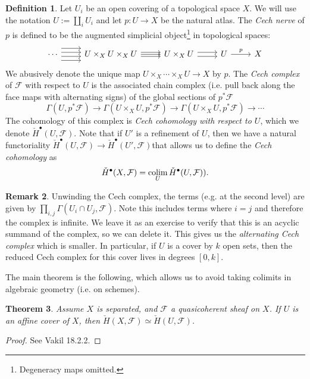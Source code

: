 \documentclass[10pt]{article}
\newtheorem{thm}{Theorem}[section]
\theoremstyle{definition}
\newtheorem{defn}[thm]{Definition}
\newtheorem{rmk}[thm]{Remark}
\newcommand{\colim}{\operatornamewithlimits{colim}}
\begin{document}
\begin{defn}
Let $U_i$ be an open covering of a topological space $X$.  We will use the notation $U := \coprod_i U_i$ and let $p: U \rightarrow X$ be the natural atlas.  The \emph{Cech nerve} of $p$ is defined to be the augmented simplicial object\footnote{Degeneracy maps omitted.} in topological spaces:
$$\begin{tikzcd}
\cdots \arrow[r, shift left=3] \arrow[r, shift left=1] \arrow[r, shift right=1] \arrow[r, shift right=3] & U \times_X U \times_X U \arrow[r, shift left] \arrow[r] \arrow[r, shift right] & U \times_X U \arrow[r, shift left] \arrow[r, shift right] & U \arrow[r, "p"] & X
\end{tikzcd}$$
We abusively denote the unique map $U \times_X \cdots \times_X U \rightarrow X$ by $p$.  The \emph{Cech complex} of $\mathcal{F}$ with respect to $U$ is the associated chain complex  (i.e. pull back along the face maps with alternating signs) of the global sections of $p^* \mathcal{F}$
$$\Gamma(U, p^* \mathcal{F}) \rightarrow \Gamma(U \times_X U, p^* \mathcal{F}) \rightarrow \Gamma(U \times_X U, p^* \mathcal{F}) \rightarrow \cdots$$
The cohomology of this complex is \emph{Cech cohomology with respect to $U$}, which we denote $\check{H}^\bullet(U, \mathcal{F})$.  Note that if $U'$ is a refinement of $U$, then we have a natural functoriality $\check{H}^\bullet(U, \mathcal{F}) \rightarrow \check{H}^\bullet(U', \mathcal{F})$that allows us to define the \emph{Cech cohomology} as
$$\check{H}^\bullet(X, \mathcal{F}) = \colim_U \check{H}^\bullet(U, \mathcal{F})).$$
\end{defn}

\begin{rmk}
Unwinding the Cech complex, the terms (e.g. at the second level) are given by $\prod_{i,j} \Gamma(U_i \cap U_j, \mathcal{F})$.  Note this includes terms where $i=j$ and therefore the complex is infinite.  We leave it as an exercise to verify that this is an acyclic summand of the complex, so we can delete it.  This gives us the \emph{alternating Cech complex} which is smaller.  In particular, if $U$ is a cover by $k$ open sets, then the reduced Cech complex for this cover lives in degrees $[0, k]$.
\end{rmk}

The main theorem is the following, which allows us to avoid taking colimits in algebraic geometry (i.e. on schemes).
\begin{thm}
Assume $X$ is separated, and $\mathcal{F}$ a quasicoherent sheaf on $X$.  If $U$ is an affine cover of $X$, then $\check{H}(X, \mathcal{F}) \simeq \check{H}(U, \mathcal{F})$.
\end{thm}
\begin{proof}
See Vakil 18.2.2.
\end{proof}
\end{document}

